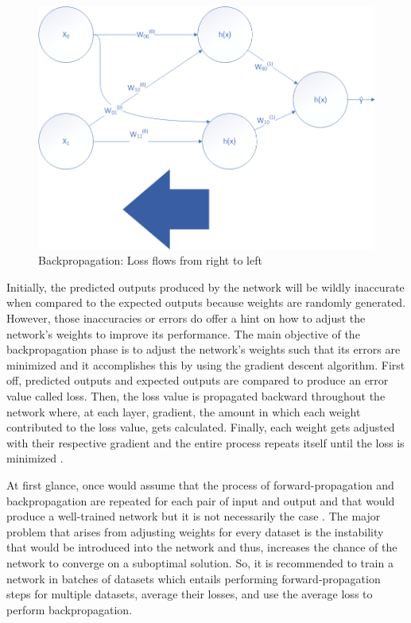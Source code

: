\documentclass[conference]{IEEEtran}
\begin{document}
        \begin{figure}[!htb]
            \centering
            \captionsetup{justification=centering}
            \includegraphics[width=\linewidth]{BackwardProp.png}
            \caption{Backpropagation: Loss flows from right to left}  
        \end{figure}

        Initially, the predicted outputs produced by the network will be wildly inaccurate when compared to the expected outputs because weights are randomly generated. However, those inaccuracies or errors do offer a hint on how to adjust the network’s weights to improve its performance. The main objective of the backpropagation phase is to adjust the network’s weights such that its errors are minimized and it accomplishes this by using the gradient descent algorithm. First off, predicted outputs and expected outputs are compared to produce an error value called loss. Then, the loss value is propagated backward throughout the network where, at each layer, gradient, the amount in which each weight contributed to the loss value, gets calculated. Finally, each weight gets adjusted with their respective gradient and the entire process repeats itself until the loss is minimized \cite{kostadinov_2019}.

        At first glance, once would assume that the process of forward-propagation and backpropagation are repeated for each pair of input and output and that would produce a well-trained network but it is not necessarily the case \cite{ruder2017overview}. The major problem that arises from adjusting weights for every dataset is the instability that would be introduced into the network and thus, increases the chance of the network to converge on a suboptimal solution. So, it is recommended to train a network in batches of datasets which entails performing forward-propagation steps for multiple datasets, average their losses, and use the average loss to perform backpropagation. 
\end{document}
